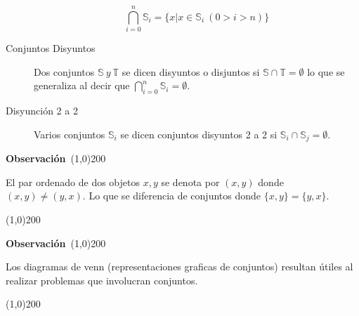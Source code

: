 \documentclass[a4paper,dvipsnames]{book}
\newenvironment{obs}
    {
        \begin{flushleft}
       \textbf{Observación}\
        \line(1,0){200} \
        \end{flushleft}
    }
    {
        \begin{flushright}
        \line(1,0){200}
        \end{flushright}
    }
\begin{document}
\begin{description}
\begin{equation*}
                \bigcap_{i=0}^{n}\mathbb S_{i} = \{x|x\in \mathbb S_{i}\ (0>i>n)\}
            \end{equation*}

        \item[Conjuntos Disyuntos] Dos conjuntos $\mathbb S\ y\ \mathbb T$ se
            dicen disyuntos o disjuntos si $\mathbb S\cap \mathbb T=\emptyset$
            lo que se generaliza al decir que $\bigcap_{i=0}^{n}\mathbb
            S_{i}=\emptyset$.

        \item[Disyunción 2 a 2] Varios conjuntos $\mathbb S_i$ se dicen
            conjuntos disyuntos 2 a 2 si $\mathbb S_i \cap \mathbb
            S_j=\emptyset$.
    \end{description}

    \begin{obs}
        El par ordenado de dos objetos $x,y$ se denota por $(x,y)$ donde
        $(x,y)\ne(y,x)$. Lo que se diferencia de conjuntos donde
        $\{x,y\}=\{y,x\}$.
    \end{obs}

    \begin{obs}
        Los diagramas de venn (representaciones graficas de conjuntos) resultan
        útiles al realizar problemas que involucran conjuntos.
    \end{obs}
\end{document}
